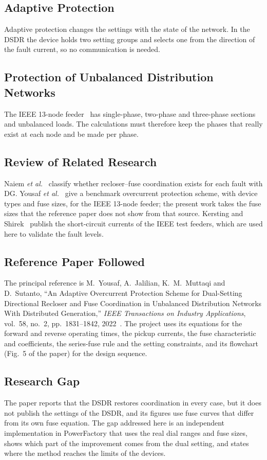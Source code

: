 \documentclass[12pt,letterpaper]{article}
\newcommand{\PF}{PowerFactory}
\begin{document}
\subsection{Adaptive Protection}
Adaptive protection changes the settings with the state of the network. In the DSDR the device holds two
setting groups and selects one from the direction of the fault current, so no communication is needed.

\subsection{Protection of Unbalanced Distribution Networks}
The IEEE 13-node feeder~\cite{kersting1991} has single-phase, two-phase and three-phase sections and
unbalanced loads. The calculations must therefore keep the phases that really exist at each node and be made
per phase.

\subsection{Review of Related Research}
Naiem \textit{et al.}~\cite{naiem2012} classify whether recloser--fuse coordination exists for each fault
with DG. Yousaf \textit{et al.}~\cite{yousaf2020} give a benchmark overcurrent protection scheme, with
device types and fuse sizes, for the IEEE 13-node feeder; the present work takes the fuse sizes that the
reference paper does not show from that source. Kersting and Shirek~\cite{kersting2012} publish the
short-circuit currents of the IEEE test feeders, which are used here to validate the fault levels.

\subsection{Reference Paper Followed}
The principal reference is M.~Yousaf, A.~Jalilian, K.~M.~Muttaqi and D.~Sutanto, ``An Adaptive Overcurrent
Protection Scheme for Dual-Setting Directional Recloser and Fuse Coordination in Unbalanced Distribution
Networks With Distributed Generation,'' \textit{IEEE Transactions on Industry Applications}, vol.~58, no.~2,
pp.~1831--1842, 2022~\cite{yousaf2022}. The project uses its equations for the forward and reverse operating
times, the pickup currents, the fuse characteristic and coefficients, the series-fuse rule and the setting
constraints, and its flowchart (Fig.~5 of the paper) for the design sequence.

\subsection{Research Gap}
The paper reports that the DSDR restores coordination in every case, but it does not publish the settings of
the DSDR, and its figures use fuse curves that differ from its own fuse equation. The gap addressed here is
an independent implementation in \PF{} that uses the real dial ranges and fuse sizes, shows which part of the
improvement comes from the dual setting, and states where the method reaches the limits of the devices.
\end{document}

